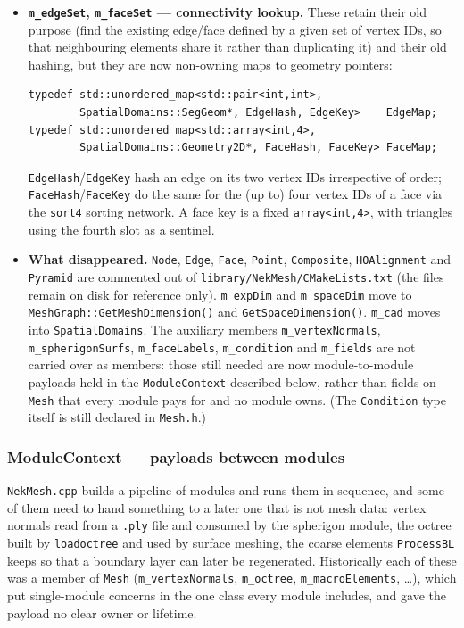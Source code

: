 \begin{itemize}
  \item \textbf{\texttt{m\_edgeSet}, \texttt{m\_faceSet} ---
    connectivity lookup.} These retain their old purpose (find the
    existing edge/face defined by a given set of vertex IDs, so that
    neighbouring elements share it rather than duplicating it) and
    their old hashing, but they are now non-owning maps to geometry
    pointers:
\begin{lstlisting}[style=BashInputStyle]
typedef std::unordered_map<std::pair<int,int>,
        SpatialDomains::SegGeom*, EdgeHash, EdgeKey>    EdgeMap;
typedef std::unordered_map<std::array<int,4>,
        SpatialDomains::Geometry2D*, FaceHash, FaceKey> FaceMap;
\end{lstlisting}
    \texttt{EdgeHash}/\texttt{EdgeKey} hash an edge on its two vertex
    IDs irrespective of order; \texttt{FaceHash}/\texttt{FaceKey} do
    the same for the (up to) four vertex IDs of a face via the
    \texttt{sort4} sorting network. A face key is a fixed
    \texttt{array<int,4>}, with triangles using the fourth slot as a
    sentinel.

  \item \textbf{What disappeared.} \texttt{Node}, \texttt{Edge},
    \texttt{Face}, \texttt{Point}, \texttt{Composite},
    \texttt{HOAlignment} and \texttt{Pyramid} are commented out of
    \texttt{library/NekMesh/CMakeLists.txt} (the files remain on disk
    for reference only). \texttt{m\_expDim} and \texttt{m\_spaceDim}
    move to \texttt{MeshGraph::GetMeshDimension()} and
    \texttt{GetSpaceDimension()}. \texttt{m\_cad} moves into
    \texttt{SpatialDomains}. The auxiliary members
    \texttt{m\_vertexNormals}, \texttt{m\_spherigonSurfs},
    \texttt{m\_faceLabels}, \texttt{m\_condition} and \texttt{m\_fields}
    are not carried over as members: those still needed are now
    module-to-module payloads held in the \texttt{ModuleContext}
    described below, rather than fields on \texttt{Mesh} that every
    module pays for and no module owns. (The \texttt{Condition} type
    itself is still declared in \texttt{Mesh.h}.)
\end{itemize}

\subsubsection{ModuleContext --- payloads between modules}
\texttt{NekMesh.cpp} builds a pipeline of modules and runs them in
sequence, and some of them need to hand something to a later one that
is not mesh data: vertex normals read from a \texttt{.ply} file and
consumed by the spherigon module, the octree built by
\texttt{loadoctree} and used by surface meshing, the coarse elements
\texttt{ProcessBL} keeps so that a boundary layer can later be
regenerated. Historically each of these was a member of \texttt{Mesh}
(\texttt{m\_vertexNormals}, \texttt{m\_octree},
\texttt{m\_macroElements}, \ldots), which put single-module concerns in
the one class every module includes, and gave the payload no clear
owner or lifetime.

